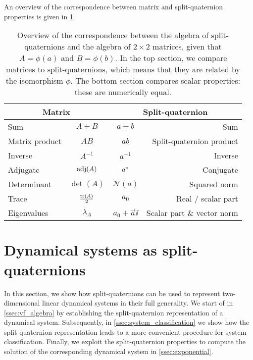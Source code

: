 An overview of the correspondence between matrix and split-quaternion properties is given in \cref{tab:spquat_matrices}.

\renewcommand{\arraystretch}{1.3}
\begin{table}[ht!]
    \centering
    \caption{Overview of the correspondence between the algebra of split-quaternions and the algebra of \(2\times2\) matrices, given that \(A = \phi(a)\) and \(B = \phi(b)\). In the top section, we compare matrices to split-quaternions, which means that they are related by the isomorphism \(\phi\). The bottom section compares scalar properties: these are numerically equal.}
    \label{tab:spquat_matrices}
    \begin{tabular}{lc|cr}
    \toprule
        \multicolumn{2}{c}{\textbf{Matrix}} & \multicolumn{2}{c}{\textbf{Split-quaternion}} \\
    \midrule
        Sum      & \( A + B \)      & \( a + b\) & Sum \\
        Matrix product  & \( AB \)  & \( ab\) & Split-quaternion product \\
        Inverse  & \(A^{-1}\)       & \(a^{-1}\) & Inverse \\
        Adjugate & \(\operatorname{adj}(A)\) & \(a^*\) & Conjugate \\
        \midrule
        Determinant & \(\det(A)\) & \(\mathscr{N}(a)\) & Squared norm \\
        Trace       & \(\frac{\trace(A)}{2}\) & \(a_0\) & Real / scalar part \\
        Eigenvalues \hspace{1.5cm} & \(\lambda_{A} \) & \( a_0 + \vec{a}\ii \) & Scalar part \& vector norm \\
    \bottomrule
    \end{tabular}
\end{table}
\renewcommand{\arraystretch}{1}

\section{Dynamical systems as split-quaternions}
\label{sec:system_classification}
In this section, we show how split-quaternions can be used to represent two-dimensional linear dynamical systems in their full generality. We start of in \cref{ssec:vf_algebra} by establishing the split-quaternion representation of a dynamical system. Subsequently, in \cref{ssec:system_classification} we show how the split-quaternion representation leads to a more convenient procedure for system classification. Finally, we exploit the split-quaternion properties to compute the solution of the corresponding dynamical system in \cref{ssec:exponential}.


